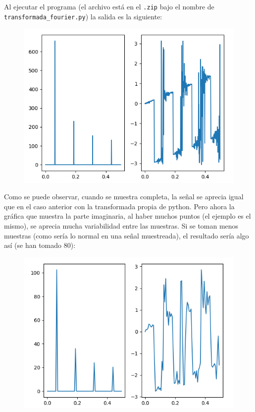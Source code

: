 \documentclass[11pt,a4paper]{article}
\begin{document}
Al ejecutar el programa (el archivo está en el \texttt{.zip} bajo el nombre de \texttt{transformada\_fourier.py})
la salida es la siguiente:

\begin{figure}[H]
	\centering
	\includegraphics[scale=0.4]{img/mi_fft.png}
\end{figure}

Como se puede observar, cuando se muestra completa, la señal se aprecia igual que en el caso anterior con la transformada propia de python. Pero ahora la gráfica que muestra la parte imaginaria, al haber muchos puntos (el ejemplo es el mismo), se aprecia mucha variabilidad entre las muestras. Si se toman menos muestras (como sería lo normal en una señal muestreada), el resultado sería algo así (se han tomado 80):

\begin{figure}[H]
	\centering
	\includegraphics[scale=0.4]{img/mi_fft_smol.png}
\end{figure}
\end{document}
